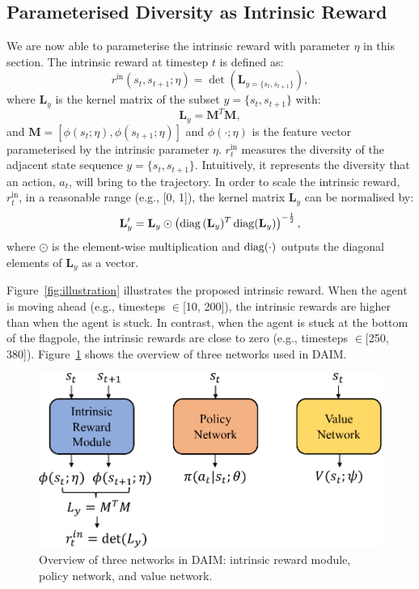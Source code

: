 \subsection{Parameterised Diversity as Intrinsic Reward}
We are now able to parameterise the intrinsic reward with parameter $\eta$ in this section. The intrinsic reward at timestep $t$ is defined as:
\begin{equation}
    r^{\text{in}}(s_t, s_{t+1}; \eta) = \det\left(\mathbf{L}_{{y}=\{s_{t},s_{t+1}\}}\right),
\label{eq:intrinsic}
\end{equation}
where $\mathbf{L}_{y}$ is the kernel matrix of the subset $y=\{s_{t}, s_{t+1}\}$ with:
\begin{equation}
    \mathbf{L}_{y} = \mathbf{M}^{T}\mathbf{M},
\label{eq:kernel_matrix}
\end{equation}
and $\mathbf{M} = [\phi(s_{t};\eta),\phi(s_{t+1};\eta)]$ and $\phi(\cdot;\eta)$ is the feature vector parameterised by the intrinsic parameter $\eta$.
$r_{t}^{\text{in}}$ measures the diversity of the adjacent state sequence ${y}=\{s_{t},s_{t+1}\}$. Intuitively, it represents the diversity that an action, $a_t$, will bring to the trajectory. In order to scale the intrinsic reward, $r^{\text{in}}_{t}$, in a reasonable range ({e.g.}, [0, 1]), the kernel matrix $\mathbf{L}_{y}$ can be normalised by:
\begin{equation}
    \mathbf{L}_{y}^{\prime} = \mathbf{L}_{y} \odot \left(\operatorname{diag}{(\mathbf{L}_{y}})^{T}\operatorname{diag}({\mathbf{L}_{y}})\right)^{-\frac{1}{2}},
\end{equation}
where $\odot$ is the element-wise multiplication and $\operatorname{diag}(\cdot)$ outputs the diagonal elements of $\mathbf{L}_{y}$ as a vector. 

Figure~\ref{fig:illustration} illustrates the proposed intrinsic reward. When the agent is moving ahead (e.g., timesteps $\in$[10, 200]), the intrinsic rewards are higher than when the agent is stuck. In contrast, when the agent is stuck at the bottom of the flagpole, the intrinsic rewards are close to zero (e.g., timesteps $\in$[250, 380]). Figure~\ref{fig:structure_overview} shows the overview of three networks used in DAIM.

\begin{figure}[h]
    \centering
    \includegraphics[width=0.7\linewidth]{figures/chapter5/daim-struct.pdf}
    \caption[Overview of three networks in DAIM.]{Overview of three networks in DAIM: intrinsic reward module, policy network, and value network.}
    \label{fig:structure_overview}
\end{figure}


